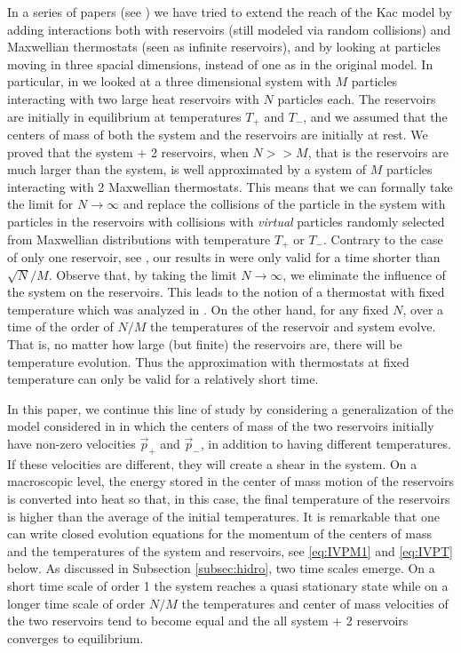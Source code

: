\documentclass{article}
\begin{document}
In a series of papers (see \cite{BLV,BLTV,BGLR,BLP25}) we have tried to extend the reach of the Kac model by adding
interactions both with reservoirs (still modeled via random collisions) and Maxwellian thermostats (seen as infinite
reservoirs), and by looking at particles moving in three spacial dimensions, instead of one as in the original model. In
particular, in \cite{BLP25} we looked at a three dimensional system with $M$ particles interacting with two large heat
reservoirs with $N$ particles each. The reservoirs are initially in equilibrium at temperatures $T_+$ and $T_-$, and we
assumed that the centers of mass of both the system and the reservoirs are initially at rest. We proved that the system
+ 2 reservoirs, when $N>>M$, that is the reservoirs are much larger than the system, is well approximated by a system of
$M$ particles interacting with 2 Maxwellian thermostats. This means that we can formally take the limit for $N\to\infty$
and replace the collisions of the particle in the system with particles in the reservoirs with collisions with {\it
virtual} particles randomly selected from Maxwellian distributions with temperature $T_+$ or $T_-$. Contrary to the case
of only one reservoir, see \cite{BLTV}, our results in \cite{BLP25} were only valid for a time shorter than
$\sqrt{N}/M$. Observe that, by taking the limit $N\to\infty$, we eliminate the influence of the system on the
reservoirs. This leads to the notion of a thermostat with fixed temperature which was analyzed in \cite{BLTV}. On the
other hand, for any fixed $N$, over a time of the order of $N/M$ the temperatures of the reservoir and system evolve.
That is, no matter how large (but finite) the reservoirs are, there will be temperature evolution. Thus the
approximation with thermostats at fixed temperature can only be valid for a relatively short time.

In this paper, we continue this line of study by considering a generalization of the model considered in \cite{BLP25} in
which the centers of mass of the two reservoirs initially have non-zero velocities $\vec p_+$ and $\vec p_-$, in
addition to having different temperatures. If these velocities are different, they will create a shear in the system. On
a macroscopic level, the energy stored in the center of mass motion of the reservoirs is converted into heat so that, in
this case, the final temperature of the reservoirs is higher than the average of the initial temperatures. It is
remarkable that one can write closed evolution equations for the momentum of the centers of mass and the temperatures of
the system and reservoirs, see \eqref{eq:IVPM1} and \eqref{eq:IVPT} below. As discussed in Subsection
\ref{subsec:hidro}, two time scales emerge. On a short time scale of order 1 the system reaches a quasi stationary state
while on a longer time scale of order $N/M$ the temperatures and center of mass velocities of the two reservoirs tend to
become equal and the all system + 2 reservoirs converges to equilibrium.
\end{document}
